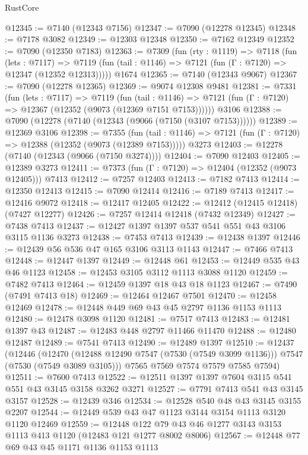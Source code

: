 \begin{lexlean}{RustCore}
\begin{coremodule}
@12345 := @7140 (@12343 @7156)
@12347 := @7090 (@12278 @12345)
@12348 := @7178 @3082
@12349 := @12303 @12348
@12350 := @7162 @12349
@12352 := @7090 (@12350 @7183)
@12363 := @7309
    (fun (rty : @1119) =>
    @7118
      (fun (lets : @7117) =>
      @7119 (fun (tail : @1146) => @7121 (fun (Γ : @7120) => @12347 (@12352 @12313)))))
    @1674
@12365 := @7140 (@12343 @9067)
@12367 := @7090 (@12278 @12365)
@12369 := @9074 @12308 @9481
@12381 := @7331
    (fun (lets : @7117) =>
    @7119
      (fun (tail : @1146) =>
      @7121 (fun (Γ : @7120) => @12367 (@12352 (@9073 (@12369 @7151 @7153))))))
    @3106
@12388 := @7090 (@12278 (@7140 (@12343 (@9066 (@7150 (@3107 @7153))))))
@12389 := @12369 @3106
@12398 := @7355
    (fun (tail : @1146) => @7121 (fun (Γ : @7120) => @12388 (@12352 (@9073 (@12389 @7153)))))
    @3273
@12403 := @12278 (@7140 (@12343 (@9066 (@7150 @3274))))
@12404 := @7090 @12403
@12405 := @12389 @3273
@12411 := @7373 (fun (Γ : @7120) => @12404 (@12352 (@9073 @12405))) @7413
@12412 := @7257 @12403
@12413 := @7182 @7413
@12414 := @12350 @12413
@12415 := @7090 @12414
@12416 := @7189 @7413
@12417 := @12416 @9072
@12418 := @12417 @12405
@12422 := @12412 (@12415 @12418) (@7427 @12277)
@12426 := @7257 @12414 @12418 (@7432 @12349)
@12427 := @7438 @7413
@12437 := @12427 @1397 @1397 @537 @541 @551 @43 @3106 @3115 @1136 @3273
@12438 := @7453 @7413
@12439 := @12438 @1397
@12446 := @12439 @56 @536 @47 @165 @3106 @3113 @1143
@12447 := @7466 @7413
@12448 := @12447 @1397
@12449 := @12448 @61
@12453 := @12449 @535 @43 @46 @1123
@12458 := @12453 @3105 @3112 @1113 @3088 @1120
@12459 := @7482 @7413
@12464 := @12459 @1397 @18 @43 @18 @1123
@12467 := @7490 (@7491 @7413 @18)
@12469 := @12464 @12467 @7501
@12470 := @12458 @12469
@12478 := @12448 @449 @69 @43 @45 @2797 @1136 @1153 @1113
@12480 := @12478 @3098 @1120
@12481 := @7517 @7413
@12483 := @12481 @1397 @43
@12487 := @12483 @448 @2797 @11466 @11470
@12488 := @12480 @12487
@12489 := @7541 @7413
@12490 := @12489 @1397
@12510 := @12437
    (@12446
      (@12470 (@12488 @12490 @7547 (@7530 (@7549 @3099 @1136))) @7547 (@7530 (@7549 @3089 @3105)))
      @7565
      @7569
      @7574
      @7579
      @7585
      @7594)
@12511 := @7600 @7413
@12522 := @12511 @1397 @1397 @7604 @3115 @541 @551 @43 @3145 @3158 @3262 @3271
@12527 := @7791 @7413 @541 @43 @3145 @3157
@12528 := @12439 @346
@12534 := @12528 @540 @48 @43 @3145 @3155 @2207
@12544 := @12449 @539 @43 @47 @1123 @3144 @3154 @1113 @3120 @1120 @12469
@12559 := @12448 @122 @79 @43 @46 @1277 @3143 @3153 @1113 @413 @1120 (@12483 @121 @1277 @8002 @8006)
@12567 := @12448 @77 @69 @43 @45 @1171 @1136 @1153 @1113

\end{coremodule}
\end{lexlean}
